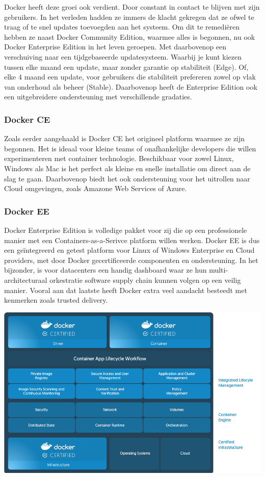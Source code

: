 Docker heeft deze groei ook verdient. Door constant in contact te blijven met zijn gebruikers. In het verleden hadden ze immers de klacht gekregen dat ze ofwel te traag of te snel updates toevoegden aan het systeem. Om dit te remediëren hebben ze naast Docker Community Edition, waarmee alles is begonnen, nu ook Docker Enterprise Edition in het leven geroepen. Met daarbovenop een verschuiving naar een tijdgebaseerde updatesysteem. Waarbij je kunt kiezen tussen elke maand een update, maar zonder garantie op stabiliteit (Edge). Of, elke 4 maand een update, voor gebruikers die stabiliteit prefereren zowel op vlak van onderhoud als beheer (Stable). Daarbovenop heeft de Enterprise Edition ook een uitgebreidere ondersteuning met verschillende gradaties. ~\autocite{EEvCE}

\subsubsection{Docker CE}
Zoals eerder aangehaald is Docker CE het origineel platform waarmee ze zijn begonnen. Het is ideaal voor kleine teams of onafhankelijke developers die willen experimenteren met container technologie. Beschikbaar voor zowel Linux, Windows als Mac is het perfect als kleine en snelle installatie om direct aan de slag te gaan. Daarbovenop biedt het ook ondersteuning voor het uitrollen naar Cloud omgevingen, zoals Amazone Web Services of Azure. ~\autocite{DockerCE}

\subsubsection{Docker EE}
Docker Enterprise Edition is volledige pakket voor zij die op een professionele manier met een Containers-as-a-Serivce platform willen werken. Docker EE is dus een geïntegreerd en getest platform voor Linux of Windows Enterprise en Cloud providers, met door Docker gecertificeerde componenten en ondersteuning. In het bijzonder, is voor datacenters een handig dashboard waar ze hun multi-architecturaal orkestratie software supply chain kunnen volgen op een veilig manier. Vooral aan dat laatste heeft Docker extra veel aandacht besteedt met kenmerken zoals trusted delivery. ~\autocite{DockerEE}

\begin{center}
	\includegraphics[scale=0.2]{img/dockerce.png}
\end{center}


